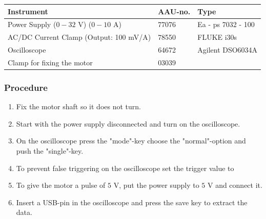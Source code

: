 \begin{table}[H]
\begin{tabular}{|l|l|p{4cm}|}
\hline%
  \textbf{Instrument}                    &  \textbf{AAU-no.}  &  \textbf{Type}       \\
\hline%
  Power Supply ($0 - 32$ V) ($0 - 10$ A) &  77076             &  Ea - ps 7032 - 100  \\
\hline%
  AC/DC Current Clamp (Output: 100 mV/A) &  78550             &  FLUKE i30s          \\
\hline%
  Oscilloscope                           &  64672             &  Agilent DSO6034A    \\
\hline%
  Clamp for fixing the motor             &  03039             &                      \\
\hline%
\end{tabular}
\end{table}

\subsubsection{Procedure}

\begin{enumerate}
  \item Fix the motor shaft so it does not turn.
  \item Start with the power supply disconnected and turn on the oscilloscope.
  \item On the oscilloscope press the "mode"-key choose the "normal"-option and push the "single"-key.
  \item To prevent false triggering on the oscilloscope set the trigger value to %
  \item To give the motor a pulse of $5$ V, put the power supply to $5$ V and connect it.
  \item Insert a USB-pin in the oscilloscope and press the save key to extract the data.
\end{enumerate}


